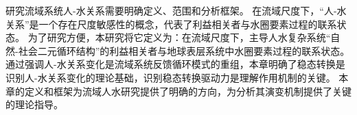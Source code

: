 研究流域系统人-水关系需要明确定义、范围和分析框架。
在流域尺度下，“人-水关系”是一个存在尺度敏感性的概念，代表了利益相关者与水圈要素过程的联系状态。
为了研究方便，本研究将它定义为：在流域尺度下，主导人水复杂系统“自然-社会二元循环结构”的利益相关者与地球表层系统中水圈要素过程的联系状态。
通过强调人-水关系变化是流域系统反馈循环模式的重组，本章明确了稳态转换是识别人-水关系变化的理论基础，识别稳态转换驱动力是理解作用机制的关键。
本章的定义和框架为流域人水研究提供了明确的方向，为分析其演变机制提供了关键的理论指导。

